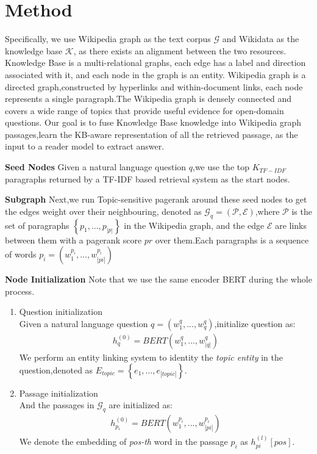 \documentclass[sigconf]{acmart}
\begin{document}
	\section{Method}
	Specifically, we use Wikipedia graph\cite{asai2019learning}
	as the text corpus $\mathcal{G}$ and Wikidata\cite{vrandevcic2014wikidata}  as the knowledge base $\mathcal{K}$, as there exists an alignment between the two resources.
	Knowledge Base is a multi-relational graphs, each edge has a label and direction associated with it, and each node in the graph is an entity.
	Wikipedia graph\cite{asai2019learning} is a directed graph,constructed by hyperlinks and within-document links, each node represents a single paragraph.The Wikipedia graph is densely connected and covers a wide range of topics that provide useful evidence for open-domain questions.
	Our goal is to fuse Knowledge Base knowledge into Wikipedia graph passages,learn the KB-aware representation of all the retrieved passage, as the input to a reader model to extract answer.
	
	\textbf{Seed Nodes}  Given a natural language question $q$,we use the top $K_{TF-IDF}$ paragraphs  returned by a TF-IDF based retrieval system as the start nodes. 
	
	\textbf{Subgraph}
	Next,we run Topic-sensitive pagerank\cite{haveliwala2003topic} around these seed nodes  to get the edges weight over their neighbouring, denoted as  $\mathcal{G}_q = (\mathcal{P},\mathcal{E})$,where $\mathcal{P}$ is the set of paragraphs $\left\{p_1,...,p_{|p|}\right\}$ in the Wikipedia graph, and the edge $\mathcal{E}$ are links between them with a pagerank score $pr$ over them.Each paragraphs is a
	sequence of words $p_i = (w_1^{p_i},...,w_{|pi|}^{p_i})$
	
	\textbf{Node Initialization}
	Note that 	we use the same encoder BERT during the whole process.
	\begin{enumerate}[(1)]
		\item Question initialization\\
		Given a natural language question $q = (w_1^q,...,w_q^q)$,initialize question as:
		\begin{displaymath}
			\begin{aligned}
				h_q^{(0)} = BERT(w_1^q,...,w_{|q|}^q)				
			\end{aligned}
		\end{displaymath}
		We perform an entity linking system\cite{ferragina2011fast} to identity the \emph{topic entity} in the question,denoted as $E_{topic}=\left\{e_1,...,e_{|topic|}\right\}$.
		
		\item Passage initialization\\
		And the passages in $\mathcal{G}_q$ are initialized as:
		\begin{displaymath}
			\begin{aligned}
				h_{p_i}^{(0)} = BERT(w_1^{p_i},...,w_{|pi|}^{p_i})				
			\end{aligned}
		\end{displaymath}	
		We denote  the embedding of  \emph{pos-th} word in the passage $p_{i}$ as $h^{(l)}_{pi}[pos]$.

	\end{enumerate}
	
\end{document}
